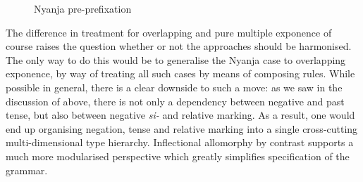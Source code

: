 \documentclass[output=paper
 	        ,biblatex
                ,babelshorthands
                ,newtxmath
                ,draftmode
                ,colorlinks, citecolor=brown
]{langscibook}
\begin{document}
\begin{exe}
\begin{xlist}
\begin{exe}
\begin{xlist}
\begin{figure}
  \centering
{}    
  \caption{Nyanja pre-prefixation \citep[210]{Crysmann:14:OUP}}\label{fig:Nyanja}
\end{figure}

The difference in treatment for overlapping and pure multiple
exponence of course raises the question whether or not the approaches
should be harmonised. The only way to do this would be to generalise
the Nyanja case to overlapping exponence, by way of treating all such
cases by means of composing rules. While possible in general, there is
a clear downside to such a move: as we saw in the discussion of
 above, there is not only a dependency between negative and
past tense, but also between negative \textit{si-} and relative
marking. As a result, one would end up organising negation, tense and
relative marking into a single cross-cutting multi-dimensional type
hierarchy. Inflectional allomorphy by contrast supports a much more
modularised perspective which greatly simplifies specification of the
grammar.  


\end{xlist}
\end{exe}
\end{xlist}
\end{exe}
\end{document}
